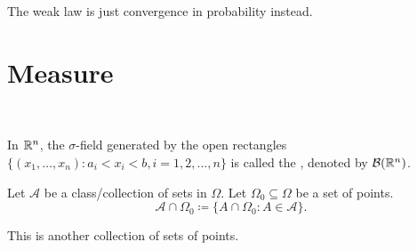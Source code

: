 \documentclass[class=article,crop=false]{standalone}
\begin{document}
\begin{note}[]
The weak law is just convergence in probability instead.
\end{note}
\newpage
\section*{Measure}
~\begin{defn}
	In $ \mathbb{R}^{n}$, the $\sigma$-field generated by the open rectangles $ \{(x_1,\ldots,x_n): a_i < x_i < b, i=1,2,\ldots,n\} $ is called the , denoted by $ \mathcal{B}( \mathbb{R}^{n})$. 
\end{defn}

\begin{defn}[]
Let $ \mathcal{A}$ be a class/collection of sets in $ \Omega$. Let $ \Omega_0 \subseteq \Omega$ be a set of points. 
\[
\mathcal{A} \cap \Omega_0 \coloneqq \{A \cap \Omega_0: A \in \mathcal{A}\} 
.\] 
\end{defn}
\begin{note}[]
This is another collection of sets of points.
\end{note}
\end{document}
